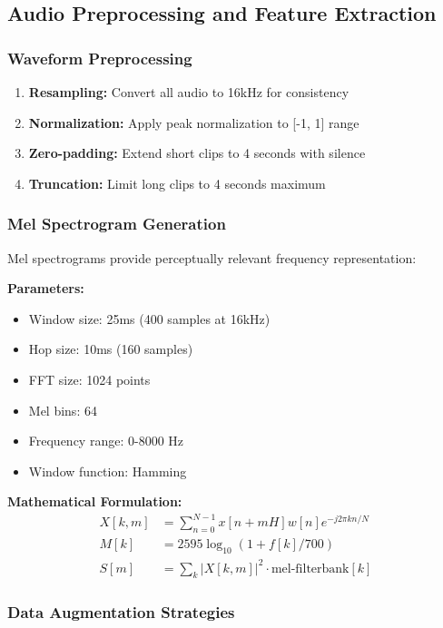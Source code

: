 \documentclass[conference]{IEEEtran}
\begin{document}
\subsection{Audio Preprocessing and Feature Extraction}
\label{sec:q2_preprocessing}

\subsubsection{Waveform Preprocessing}
\label{sec:q2_waveform_prep}

\begin{enumerate}[label=\arabic*.]
  \item \textbf{Resampling:} Convert all audio to 16kHz for consistency
  \item \textbf{Normalization:} Apply peak normalization to [-1, 1] range
  \item \textbf{Zero-padding:} Extend short clips to 4 seconds with silence
  \item \textbf{Truncation:} Limit long clips to 4 seconds maximum
\end{enumerate}

\subsubsection{Mel Spectrogram Generation}
\label{sec:q2_melspec}

Mel spectrograms provide perceptually relevant frequency representation:

\textbf{Parameters:}
\begin{itemize}
  \item Window size: 25ms (400 samples at 16kHz)
  \item Hop size: 10ms (160 samples)
  \item FFT size: 1024 points
  \item Mel bins: 64
  \item Frequency range: 0-8000 Hz
  \item Window function: Hamming
\end{itemize}

\textbf{Mathematical Formulation:}
\begin{align}
X[k,m] &= \sum_{n=0}^{N-1} x[n+mH] w[n] e^{-j 2\pi k n / N} \\
M[k] &= 2595 \log_{10}(1 + f[k]/700) \\
S[m] &= \sum_{k} |X[k,m]|^2 \cdot \text{mel-filterbank}[k]
\end{align}

\subsubsection{Data Augmentation Strategies}
\label{sec:q2_augmentation}
\end{document}
